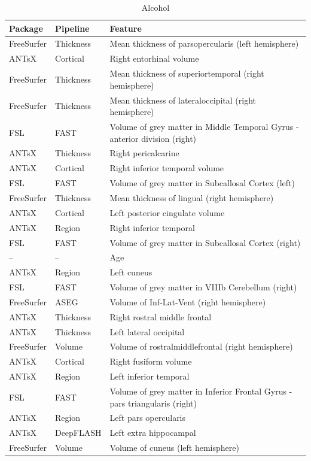 \documentclass[
  10pt,
]{article}
\begin{document}
\begin{table}

\caption{\label{tab:compare-predictions}Alcohol}
\centering
\begin{tabular}[t]{lll}
\toprule
Package & Pipeline & Feature\\
\midrule
FreeSurfer & Thickness & Mean thickness of parsopercularis (left hemisphere)\\
ANTsX & Cortical & Right entorhinal volume\\
FreeSurfer & Thickness & Mean thickness of superiortemporal (right hemisphere)\\
FreeSurfer & Thickness & Mean thickness of lateraloccipital (right hemisphere)\\
FSL & FAST & Volume of grey matter in Middle Temporal Gyrus - anterior division (right)\\
\addlinespace
ANTsX & Thickness & Right pericalcarine\\
ANTsX & Cortical & Right inferior temporal volume\\
FSL & FAST & Volume of grey matter in Subcallosal Cortex (left)\\
FreeSurfer & Thickness & Mean thickness of lingual (right hemisphere)\\
ANTsX & Cortical & Left posterior cingulate volume\\
\addlinespace
ANTsX & Region & Right inferior temporal\\
FSL & FAST & Volume of grey matter in Subcallosal Cortex (right)\\
-- & -- & Age\\
ANTsX & Region & Left cuneus\\
FSL & FAST & Volume of grey matter in VIIIb Cerebellum (right)\\
\addlinespace
FreeSurfer & ASEG & Volume of Inf-Lat-Vent (right hemisphere)\\
ANTsX & Thickness & Right rostral middle frontal\\
ANTsX & Thickness & Left lateral occipital\\
FreeSurfer & Volume & Volume of rostralmiddlefrontal (right hemisphere)\\
ANTsX & Cortical & Right fusiform volume\\
\addlinespace
ANTsX & Region & Left inferior temporal\\
FSL & FAST & Volume of grey matter in Inferior Frontal Gyrus - pars triangularis (right)\\
ANTsX & Region & Left pars opercularis\\
ANTsX & DeepFLASH & Left extra hippocampal\\
FreeSurfer & Volume & Volume of cuneus (left hemisphere)\\
\bottomrule
\end{tabular}
\end{table}
\end{document}
